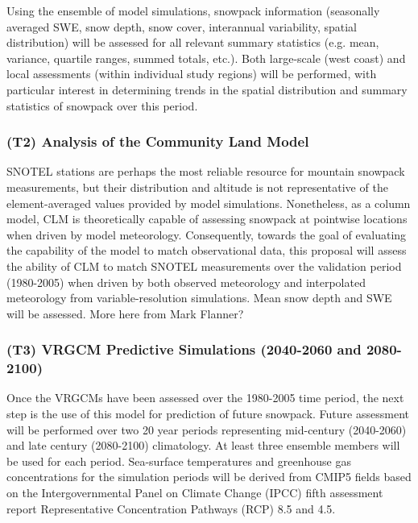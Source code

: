 \documentclass[11pt]{article}
\begin{document}
Using the ensemble of model simulations, snowpack information (seasonally averaged SWE, snow depth, snow cover, interannual variability, spatial distribution) will be assessed for all relevant summary statistics (e.g. mean, variance, quartile ranges, summed totals, etc.). Both large-scale (west coast) and local assessments (within individual study regions) will be performed, with particular interest in determining trends in the spatial distribution and summary statistics of snowpack over this period.


\subsubsection{(T2) Analysis of the Community Land Model}

SNOTEL stations are perhaps the most reliable resource for mountain snowpack measurements, but their distribution and altitude is not representative of the element-averaged values provided by model simulations.  Nonetheless, as a column model, CLM is theoretically capable of assessing snowpack at pointwise locations when driven by model meteorology.  Consequently, towards the goal of evaluating the capability of the model to match observational data, this proposal will assess the ability of CLM to match SNOTEL measurements over the validation period (1980-2005) when driven by both observed meteorology and interpolated meteorology from variable-resolution simulations.  Mean snow depth and SWE will be assessed.  {\color{red} More here from Mark Flanner?}

\subsubsection{(T3) VRGCM Predictive Simulations (2040-2060 and 2080-2100)}

Once the VRGCMs have been assessed over the 1980-2005 time period, the next step is the use of this model for prediction of future snowpack.  Future assessment will be performed over two 20 year periods representing mid-century (2040-2060) and late century (2080-2100) climatology.  At least three ensemble members will be used for each period.  Sea-surface temperatures and greenhouse gas concentrations for the simulation periods will be derived from CMIP5 fields based on the Intergovernmental Panel on Climate Change (IPCC) fifth assessment report Representative Concentration Pathways (RCP) 8.5 and 4.5.
\end{document}
